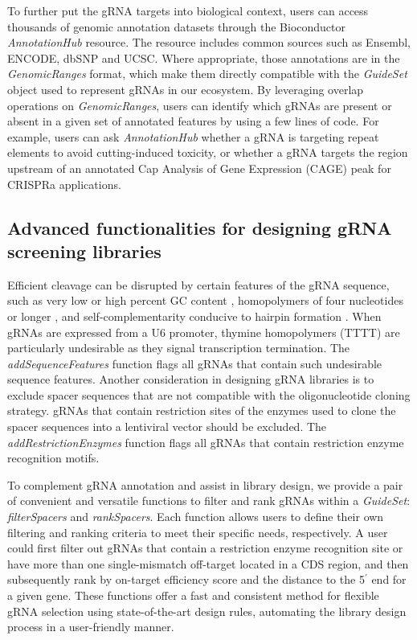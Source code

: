 \documentclass[pdftex,english,10pt]{article}
\begin{document}
To further put the gRNA targets into biological context, users can access thousands of genomic annotation datasets through the Bioconductor \textit{AnnotationHub} resource.  The resource includes common sources such as Ensembl, ENCODE, dbSNP and UCSC. Where appropriate, those annotations are in the \textit{GenomicRanges} format, which make them directly compatible with the \textit{GuideSet} object used to represent gRNAs in our ecosystem. By leveraging overlap operations on \textit{GenomicRanges}, users can identify which gRNAs are present or absent in a given set of annotated features by using a few lines of code.  For example, users can ask \textit{AnnotationHub} whether a gRNA is targeting repeat elements to avoid cutting-induced toxicity, or whether a gRNA targets the region upstream of an annotated Cap Analysis of Gene Expression (CAGE) peak for CRISPRa applications. 



\subsection{Advanced functionalities for designing gRNA screening libraries}


Efficient cleavage can be disrupted by certain features of the gRNA sequence, such as very low or high percent GC content \citep{chen2018improved, doench2014rational, wang2014genetic}, homopolymers of four nucleotides or longer \citep{gilbert2014genomescale, veeneman2020pincer}, and self-complementarity conducive to hairpin formation \citep{thyme2016internal, labun2016chopchop}. When gRNAs are expressed from a U6 promoter, thymine homopolymers (TTTT) are particularly undesirable as they signal transcription termination. The \textit{addSequenceFeatures} function flags all gRNAs that contain such undesirable sequence features. Another consideration in designing gRNA libraries is to exclude spacer sequences that are not compatible with the oligonucleotide cloning strategy. gRNAs that contain restriction sites of the enzymes used to clone the spacer sequences into a lentiviral vector should be excluded. The \textit{addRestrictionEnzymes} function flags all gRNAs that contain restriction enzyme recognition motifs.


To complement gRNA annotation and assist in library design, we provide a pair of convenient and versatile functions to filter and rank gRNAs within a \textit{GuideSet}: \textit{filterSpacers} and \textit{rankSpacers}. Each function allows users to define their own filtering and ranking criteria to meet their specific needs, respectively. A user could first filter out gRNAs that contain a restriction enzyme recognition site or have more than one single-mismatch off-target located in a CDS region, and then subsequently rank by on-target efficiency score and the distance to the 5$^{\prime}$ end for a given gene. These functions offer a fast and consistent method for flexible gRNA selection using state-of-the-art design rules, automating the library design process in a user-friendly manner.
\end{document}
